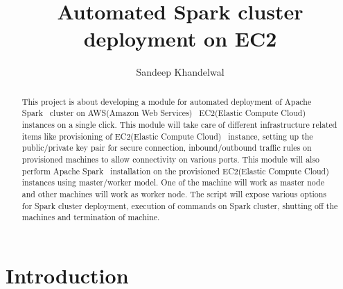 
\title{Automated Spark cluster deployment on EC2}


\author{Sandeep Khandelwal}


\renewcommand{\shortauthors}{Sandeep}


\begin{abstract}

This project is about developing a module for automated deployment of
Apache Spark~\cite{hid-sp18-511-www-spark} cluster on AWS(Amazon Web
Services)~\cite{hid-sp18-511-www-aws} EC2(Elastic Compute
Cloud)~\cite{hid-sp18-511-www-ec2} instances on a single click. This
module will take care of different infrastructure related items like
provisioning of EC2(Elastic Compute Cloud)~\cite{hid-sp18-511-www-ec2}
instance, setting up the public/private key pair for secure connection,
inbound/outbound traffic rules on provisioned machines to allow
connectivity on various ports. This module will also perform Apache
Spark~\cite{hid-sp18-511-www-spark} installation on the provisioned
EC2(Elastic Compute Cloud)~\cite{hid-sp18-511-www-ec2} instances using
master/worker model. One of the machine will work as master node and
other machines will work as worker node. The script will expose
various options for Spark cluster deployment, execution of commands on
Spark cluster, shutting off the machines and termination of machine.

\end{abstract}



\maketitle

\section{Introduction}


